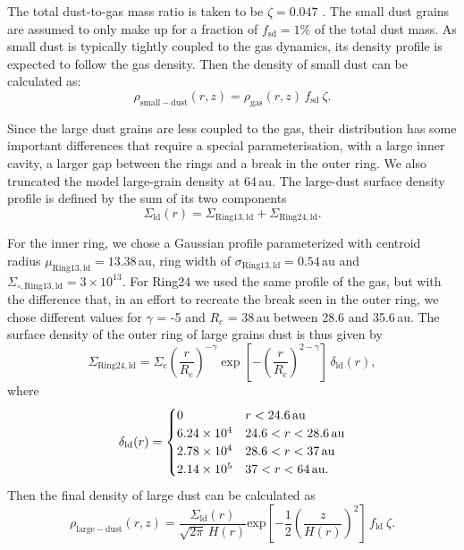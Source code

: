 \documentclass[letters,usenatbib,times]{mnras}
\begin{document}
The total dust-to-gas mass ratio is taken to be $\zeta = 0.047$ \citep[as in][]{Rosenfeld_2013}. The small dust grains are assumed to only make up for a fraction of $f_\mathrm{sd}=1\%$ of the total dust mass. As small dust is typically tightly coupled to the gas dynamics, its density profile is expected to follow the gas density. Then the density of small dust can be calculated as:
\begin{equation}
\rho_{\mathrm{small-dust}}(r,z)=\rho_{\mathrm{gas}}(r,z)\, f_{\mathrm{sd}} \: \zeta .
\end{equation}

Since the large dust grains are less coupled to the gas, their distribution has some important differences that require a special parameterisation, with a large inner cavity, a larger gap between the rings and a break in the outer ring. We also truncated the model large-grain density at 64\,au. The large-dust surface density profile is defined by the sum of its two components
\begin{equation}
  \Sigma_{\mathrm{ld}}(r) = 
  \Sigma_{\mathrm{Ring13,ld}} + \Sigma_{\mathrm{Ring24,ld}}.
\end{equation}

For the inner ring, we chose a Gaussian profile parameterized with centroid radius $\mu_{\mathrm{Ring13, ld}}=13.38$\,au, ring width of $\sigma_{\mathrm{Ring13,ld}}=0.54$\,au and $\Sigma_{\circ,\mathrm{Ring13,ld}}=3\times10^{13}$. For Ring24 we used the same profile of the gas, but with the difference that, in an effort to recreate the break seen in the outer ring, we chose different values for $\gamma$ = -5 and $R_c$ = 38\,au between 28.6 and 35.6\,au. The surface density of the outer ring of large grains dust is thus given by
\begin{equation}
    \Sigma_{\mathrm{Ring24,ld}} = \Sigma_{\mathrm{c}} \left(\frac{r}{R_{\mathrm{c}}}\right)^{-\gamma} \exp\left[-\left(\frac{r}{R_{\mathrm{c}}}\right)^{2-\gamma}\right]\,\delta_{\mathrm{ld}}(r),
\end{equation}
where
\begin{equation}
  \delta_{\mathrm{ld}}(r) =
  \begin{cases}
  0                 & r < 24.6\text{\,au} \\
  6.24 \times10^{4} & 24.6 < r < 28.6\text{\,au} \\
  2.78 \times10^{4} & 28.6 < r < 37\text{\,au} \\
  2.14 \times10^{5} & 37   < r < 64\text{\,au.} \\
  \end{cases}
\end{equation}
Then the final density of large dust can be calculated as
\begin{equation}
\rho_{\mathrm{large-dust}}(r,z)=
\frac{\Sigma_{\mathrm{ld}}(r)}{\sqrt{2\pi} \, H(r)} \mathrm{exp}\left[-\frac{1}{2} \left(\frac{z}{H(r)}\right)^2\right] \, f_{\mathrm{ld}} \: \zeta .
\end{equation}
\end{document}

